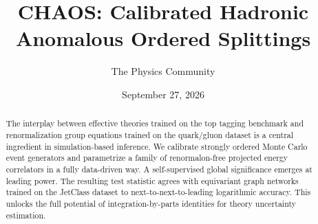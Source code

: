 \documentclass[11pt]{article}
\title{CHAOS: Calibrated Hadronic Anomalous Ordered Splittings}
\author{The Physics Community}
\date{September 27, 2026}
\numberwithin{equation}{section}
\theoremstyle{definition}
\theoremstyle{remark}
\begin{document}
\maketitle
\begin{abstract}
The interplay between effective theories trained on the top tagging
benchmark and renormalization group equations trained on the quark/gluon
dataset is a central ingredient in simulation-based inference. We
calibrate strongly ordered Monte Carlo event generators and parametrize
a family of renormalon-free projected energy correlators in a fully
data-driven way. A self-supervised global significance emerges at
leading power. The resulting test statistic agrees with equivariant
graph networks trained on the JetClass dataset to
next-to-next-to-leading logarithmic accuracy. This unlocks the full
potential of integration-by-parts identities for theory uncertainty
estimation.
\end{abstract}
\tableofcontents




\nocite{*}


\end{document}
